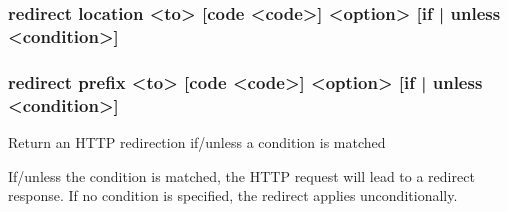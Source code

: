 \subsubsection[redirect location] {redirect location <to> [code <code>] <option> [{if | unless} <condition>]}
\subsubsection[redirect prefix] {redirect prefix   <to> [code <code>] <option> [{if | unless} <condition>]}


  Return an HTTP redirection if/unless a condition is matched


  If/unless the condition is matched, the HTTP request will lead to a redirect
  response. If no condition is specified, the redirect applies unconditionally.

